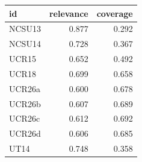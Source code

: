 \begin{tabular}{lrr}
\toprule
id & relevance & coverage \\
\midrule
NCSU13 & 0.877 & 0.292 \\
NCSU14 & 0.728 & 0.367 \\
UCR15 & 0.652 & 0.492 \\
UCR18 & 0.699 & 0.658 \\
UCR26a & 0.600 & 0.678 \\
UCR26b & 0.607 & 0.689 \\
UCR26c & 0.612 & 0.692 \\
UCR26d & 0.606 & 0.685 \\
UT14 & 0.748 & 0.358 \\
\bottomrule
\end{tabular}
